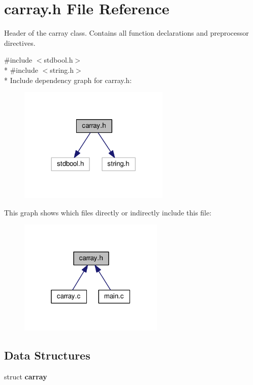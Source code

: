\section{carray.\+h File Reference}
\label{carray_8h}


Header of the carray class. Contains all function declarations and preprocessor directives.  


{\ttfamily \#include $<$stdbool.\+h$>$}\\*
{\ttfamily \#include $<$string.\+h$>$}\\*
Include dependency graph for carray.\+h\+:\nopagebreak
\begin{figure}[H]
\begin{center}
\leavevmode
\includegraphics[width=204pt]{carray_8h__incl}
\end{center}
\end{figure}
This graph shows which files directly or indirectly include this file\+:\nopagebreak
\begin{figure}[H]
\begin{center}
\leavevmode
\includegraphics[width=196pt]{carray_8h__dep__incl}
\end{center}
\end{figure}
\subsection*{Data Structures}
\begin{DoxyCompactItemize}
\item 
struct {\bf carray}
\end{DoxyCompactItemize}
